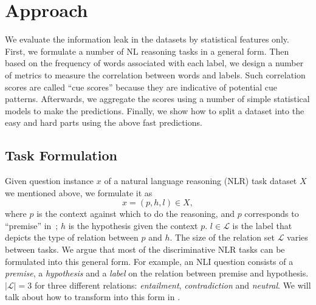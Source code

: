 \section{Approach}
\label{sec:approach}
We evaluate the information leak in the datasets by statistical features only. 
First, we formulate  a number of NL reasoning tasks in a general form. 
Then based on the frequency of words associated with each label, 
we design a number of metrics to measure the correlation between words
and labels. Such correlation scores are called ``cue scores'' because they are 
indicative of potential cue patterns. Afterwards, we aggregate the scores using a number of simple statistical
models to make the predictions. Finally, we show how to split a dataset into
the easy and hard parts using the above fast predictions.

\subsection{Task Formulation}

Given question instance $x$ of a natural language reasoning (NLR) task dataset $X$ 
we mentioned above, we formulate it as
\begin{equation}
    x = (p, h, l) \in X,
\end{equation}
\noindent
where $p$ is the context against which to do the reasoning, and $p$ corresponds 
to ``premise'' in~;
$h$ is the hypothesis given the context $p$. $l \in \mathcal{L}$ is the label that 
depicts the type of relation between $p$ and $h$. 
The size of the relation set $\mathcal{L}$ varies between tasks. We argue that 
most of the discriminative NLR tasks can be formulated into this general form. 
For example, an NLI question consists of a \textit{premise}, a \textit{hypothesis} 
and a \textit{label} on the relation between premise and hypothesis. 
$|\mathcal{L}| = 3$ for three different relations: 
\textit{entailment}, \textit{contradiction} and \textit{neutral}. 
We will talk about how to transform into this form in . 

